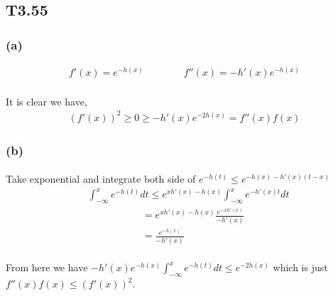 \subsection*{T3.55}
\subsubsection*{(a)}
\begin{align*}
f'(x) =e^{-h(x)}  \qquad \qquad f''(x) = -h'(x)e^{-h(x)}
\end{align*}
\paragraph{}
It is clear we have,
\begin{align*}
(f'(x))^2 \geq 0 \geq -h'(x) e^{-2h(x)}  =f''(x)f(x)
\end{align*}
\subsubsection*{(b)}
\paragraph{}
Take exponential and integrate both side of $e^{-h(t)} \leq e^{ -h(x) - h'(x) (t-x) }$
\begin{align*}
&\int_{-\infty}^{x}e^{-h(t)}dt \leq e^{xh'(x)-h(x)} \int_{-\infty}^{x}e^{-h'(x)t}dt \\
&\qquad \qquad \quad \ \ = e^{xh'(x)-h(x)}\frac{e^{-xh'(x)}}{-h'(x)} \\ 
&\qquad \qquad \quad \ \ = \frac{e^{-h(x)}}{-h'(x)}
\end{align*}
\paragraph{}
From here we have $-h'(x)e^{-h(x)}\int_{-\infty}^{x}e^{-h(t)}dt \leq e^{-2h(x)}$ which is just $f''(x)f(x) \leq (f'(x))^2$.